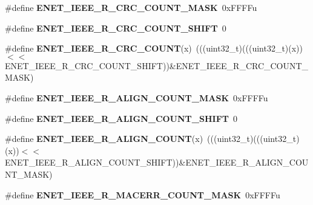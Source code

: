 \begin{DoxyCompactItemize}
\item 
\#define {\bfseries E\+N\+E\+T\+\_\+\+I\+E\+E\+E\+\_\+\+R\+\_\+\+C\+R\+C\+\_\+\+C\+O\+U\+N\+T\+\_\+\+M\+A\+SK}~0x\+F\+F\+F\+Fu\hypertarget{group__ENET__Register__Masks_ga58cf98c5746ff20054f1870ab0c9bc5e}{}\label{group__ENET__Register__Masks_ga58cf98c5746ff20054f1870ab0c9bc5e}

\item 
\#define {\bfseries E\+N\+E\+T\+\_\+\+I\+E\+E\+E\+\_\+\+R\+\_\+\+C\+R\+C\+\_\+\+C\+O\+U\+N\+T\+\_\+\+S\+H\+I\+FT}~0\hypertarget{group__ENET__Register__Masks_ga68234049dc9eac210f0412acb75b5aad}{}\label{group__ENET__Register__Masks_ga68234049dc9eac210f0412acb75b5aad}

\item 
\#define {\bfseries E\+N\+E\+T\+\_\+\+I\+E\+E\+E\+\_\+\+R\+\_\+\+C\+R\+C\+\_\+\+C\+O\+U\+NT}(x)~(((uint32\+\_\+t)(((uint32\+\_\+t)(x))$<$$<$E\+N\+E\+T\+\_\+\+I\+E\+E\+E\+\_\+\+R\+\_\+\+C\+R\+C\+\_\+\+C\+O\+U\+N\+T\+\_\+\+S\+H\+I\+FT))\&E\+N\+E\+T\+\_\+\+I\+E\+E\+E\+\_\+\+R\+\_\+\+C\+R\+C\+\_\+\+C\+O\+U\+N\+T\+\_\+\+M\+A\+SK)\hypertarget{group__ENET__Register__Masks_ga5f2922a546db478712a69bde97e43507}{}\label{group__ENET__Register__Masks_ga5f2922a546db478712a69bde97e43507}

\item 
\#define {\bfseries E\+N\+E\+T\+\_\+\+I\+E\+E\+E\+\_\+\+R\+\_\+\+A\+L\+I\+G\+N\+\_\+\+C\+O\+U\+N\+T\+\_\+\+M\+A\+SK}~0x\+F\+F\+F\+Fu\hypertarget{group__ENET__Register__Masks_ga43a415932380ce1dd7a3c8dded1421a7}{}\label{group__ENET__Register__Masks_ga43a415932380ce1dd7a3c8dded1421a7}

\item 
\#define {\bfseries E\+N\+E\+T\+\_\+\+I\+E\+E\+E\+\_\+\+R\+\_\+\+A\+L\+I\+G\+N\+\_\+\+C\+O\+U\+N\+T\+\_\+\+S\+H\+I\+FT}~0\hypertarget{group__ENET__Register__Masks_ga6a0f2d8593a546427d3f84a22dc05343}{}\label{group__ENET__Register__Masks_ga6a0f2d8593a546427d3f84a22dc05343}

\item 
\#define {\bfseries E\+N\+E\+T\+\_\+\+I\+E\+E\+E\+\_\+\+R\+\_\+\+A\+L\+I\+G\+N\+\_\+\+C\+O\+U\+NT}(x)~(((uint32\+\_\+t)(((uint32\+\_\+t)(x))$<$$<$E\+N\+E\+T\+\_\+\+I\+E\+E\+E\+\_\+\+R\+\_\+\+A\+L\+I\+G\+N\+\_\+\+C\+O\+U\+N\+T\+\_\+\+S\+H\+I\+FT))\&E\+N\+E\+T\+\_\+\+I\+E\+E\+E\+\_\+\+R\+\_\+\+A\+L\+I\+G\+N\+\_\+\+C\+O\+U\+N\+T\+\_\+\+M\+A\+SK)\hypertarget{group__ENET__Register__Masks_ga6e6197d91cb433929a390c9355a43673}{}\label{group__ENET__Register__Masks_ga6e6197d91cb433929a390c9355a43673}

\item 
\#define {\bfseries E\+N\+E\+T\+\_\+\+I\+E\+E\+E\+\_\+\+R\+\_\+\+M\+A\+C\+E\+R\+R\+\_\+\+C\+O\+U\+N\+T\+\_\+\+M\+A\+SK}~0x\+F\+F\+F\+Fu\hypertarget{group__ENET__Register__Masks_gaec114f8a37da297fa258d22d3d275def}{}\label{group__ENET__Register__Masks_gaec114f8a37da297fa258d22d3d275def}


\end{DoxyCompactItemize}
